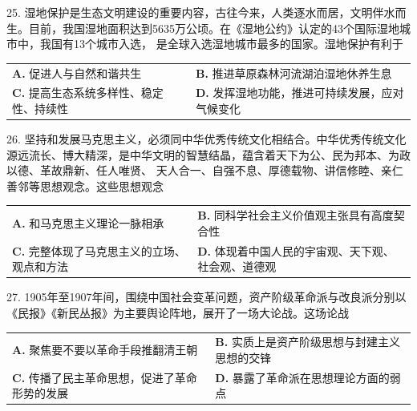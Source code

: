 \documentclass[UTF8,11pt]{ctexart}
\begin{document}
25. 湿地保护是生态文明建设的重要内容，古往今来，人类逐水而居，文明伴水而生。目前，我国湿地面积达到5635万公顷。在《湿地公约》认定的43个国际湿地城市中，我国有13个城市入选， 是全球入选湿地城市最多的国家。湿地保护有利于


\begin{center}\begin{tabular}{>{\raggedright\arraybackslash}p{\dimexpr(\linewidth-4\tabcolsep)/2\relax}>{\raggedright\arraybackslash}p{\dimexpr(\linewidth-4\tabcolsep)/2\relax}}
\textbf{A.} 促进人与自然和谐共生 & \textbf{B.} 推进草原森林河流湖泊湿地休养生息\\[.35em]
\textbf{C.} 提高生态系统多样性、稳定性、持续性 & \textbf{D.} 发挥湿地功能，推进可持续发展，应对气候变化\\[.35em]\end{tabular}\end{center}

26. 坚持和发展马克思主义，必须同中华优秀传统文化相结合。中华优秀传统文化源远流长、博大精深，是中华文明的智慧结晶，蕴含着天下为公、民为邦本、为政以德、革故鼎新、任人唯贤、 天人合一、自强不息、厚德载物、讲信修睦、亲仁善邻等思想观念。这些思想观念


\begin{center}\begin{tabular}{>{\raggedright\arraybackslash}p{\dimexpr(\linewidth-4\tabcolsep)/2\relax}>{\raggedright\arraybackslash}p{\dimexpr(\linewidth-4\tabcolsep)/2\relax}}
\textbf{A.} 和马克思主义理论一脉相承 & \textbf{B.} 同科学社会主义价值观主张具有高度契合性\\[.35em]
\textbf{C.} 完整体现了马克思主义的立场、观点和方法 & \textbf{D.} 体现着中国人民的宇宙观、天下观、社会观、道德观\\[.35em]\end{tabular}\end{center}

27. 1905年至1907年间，围绕中国社会变革问题，资产阶级革命派与改良派分别以《民报》《新民丛报》为主要舆论阵地，展开了一场大论战。这场论战


\begin{center}\begin{tabular}{>{\raggedright\arraybackslash}p{\dimexpr(\linewidth-4\tabcolsep)/2\relax}>{\raggedright\arraybackslash}p{\dimexpr(\linewidth-4\tabcolsep)/2\relax}}
\textbf{A.} 聚焦要不要以革命手段推翻清王朝 & \textbf{B.} 实质上是资产阶级思想与封建主义思想的交锋\\[.35em]
\textbf{C.} 传播了民主革命思想，促进了革命形势的发展 & \textbf{D.} 暴露了革命派在思想理论方面的弱点\\[.35em]\end{tabular}\end{center}
\end{document}
